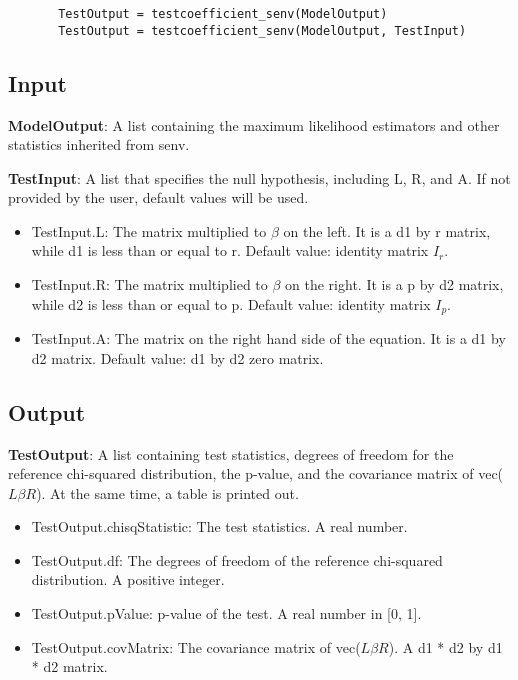 \documentclass[a4paper,11pt,openany]{memoir}
\begin{document}
\begin{verbatim}       TestOutput = testcoefficient_senv(ModelOutput)
       TestOutput = testcoefficient_senv(ModelOutput, TestInput)\end{verbatim}
    

\subsection*{Input}

\begin{par}
\textbf{ModelOutput}: A list containing the maximum likelihood estimators and other statistics inherited from senv.
\end{par} \vspace{1em}
\begin{par}
\textbf{TestInput}: A list that specifies the null hypothesis, including L, R, and A.  If not provided by the user, default values will be used.
\end{par} \vspace{1em}
\begin{itemize}
\setlength{\itemsep}{-1ex}
   \item TestInput.L: The matrix multiplied to $\beta$ on the left.  It is a d1 by r matrix, while d1 is less than or equal to r.  Default value: identity matrix $I_r$.
   \item TestInput.R: The matrix multiplied to $\beta$ on the right.  It is a p by d2 matrix, while d2 is less than or equal to p.  Default value: identity matrix $I_p$.
   \item TestInput.A: The matrix on the right hand side of the equation.  It is a d1 by d2 matrix.  Default value: d1 by d2 zero matrix.
\end{itemize}


\subsection*{Output}

\begin{par}
\textbf{TestOutput}: A list containing test statistics, degrees of freedom for the reference chi-squared distribution, the p-value, and the covariance matrix of vec($L\beta R$).  At the same time, a table is printed out.
\end{par} \vspace{1em}
\begin{itemize}
\setlength{\itemsep}{-1ex}
   \item TestOutput.chisqStatistic: The test statistics. A real number.
   \item TestOutput.df: The degrees of freedom of the reference chi-squared distribution.  A positive integer.
   \item TestOutput.pValue: p-value of the test.  A real number in [0, 1].
   \item TestOutput.covMatrix: The covariance matrix of vec($L\beta R$). A d1 * d2 by d1 * d2 matrix.
\end{itemize}
\end{document}
